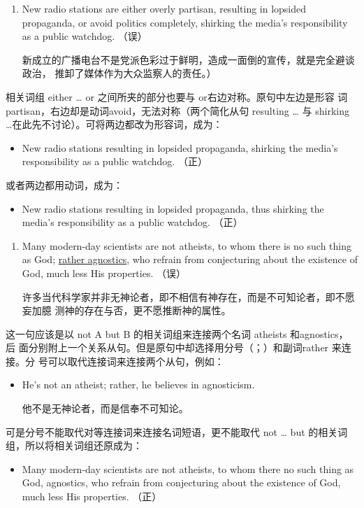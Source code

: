 \begin{enumerate}[resume]
\item New radio stations are either overly partisan, resulting in lopsided
  propaganda, or avoid politics completely, shirking the media's
  responsibility as a public watchdog. （误）

  新成立的广播电台不是党派色彩过于鲜明，造成一面倒的宣传，就是完全避谈政治，
  推卸了媒体作为大众监察人的责任。）
\end{enumerate}

相关词组 either \ldots{} or 之间所夹的部分也要与 or右边对称。原句中左边是形容
词 partisan，右边却是动词avoid，无法对称（两个简化从句 resulting
\ldots{} 与 shirking \ldots{}在此先不讨论）。可将两边都改为形容词，成为：
\begin{mybox}
\begin{itemize}
\item New radio stations  resulting in lopsided
  propaganda,  shirking the media's responsibility
  as a public watchdog. （正）
\end{itemize}
\end{mybox}
或者两边都用动词，成为：
\begin{mybox}
\begin{itemize}
\item New radio stations  resulting in
  lopsided propaganda,  thus shirking the
  media's responsibility as a public watchdog. （正）
\end{itemize}
\end{mybox}


\begin{enumerate}[resume]
\item Many modern-day scientists are not atheists, to whom there is no such
  thing as God; \ul{rather agnostics}, who refrain from conjecturing about the
  existence of God, much less His properties. （误）

  许多当代科学家并非无神论者，即不相信有神存在，而是不可知论者，即不愿妄加臆
  测神的存在与否，更不愿推断神的属性。
\end{enumerate}
这一句应该是以 not A but B 的相关词组来连接两个名词 atheists 和agnostics，后
面分别附上一个关系从句。但是原句中却选择用分号（；）和副词rather 来连接。分
号可以取代连接词来连接两个从句，例如：
\begin{itemize}
\item He's not an atheist; rather, he believes in agnosticism.

  他不是无神论者，而是信奉不可知论。
\end{itemize}
可是分号不能取代对等连接词来连接名词短语，更不能取代 not \ldots{} but
的相关词组，所以将相关词组还原成为：
\begin{itemize}
\item Many modern-day scientists are not atheists, to whom there no such thing
  as God,  agnostics, who refrain from conjecturing about the existence
  of God, much less His properties. （正）
\end{itemize}

